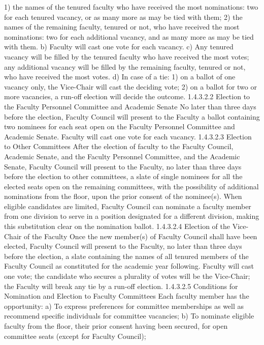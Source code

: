 \documentclass[letterpaper, 11pt]{article}
\begin{document}
1) the names of the tenured faculty who have received the most nominations:  two for each tenured vacancy, or as many more as may be tied with them;
2) the names of the remaining faculty, tenured or not, who have received the most nominations:  two for each additional vacancy, and as many more as may be tied with them.
b) Faculty will cast one vote for each vacancy.
c) Any tenured vacancy will be filled by the tenured faculty who have received the most votes; any additional vacancy will be filled by the remaining faculty, tenured or not, who have received the most votes.
d) In case of a tie:
1) on a ballot of one vacancy only, the Vice-Chair will cast the deciding vote;
2) on a ballot for two or more vacancies, a run-off election will decide the outcome.
1.4.3.2.2 Election to the Faculty Personnel Committee and Academic Senate
   No later than three days before the election, Faculty Council will present to the Faculty a ballot containing two nominees for each seat open on the Faculty Personnel Committee and Academic Senate.  Faculty will cast one vote for each vacancy.
1.4.3.2.3 Election to Other Committees
   After the election of faculty to the Faculty Council, Academic Senate, and the Faculty Personnel Committee, and the Academic Senate, Faculty Council will present to the Faculty, no later than three days before the election to other committees, a slate of single nominees for all the elected seats open on the remaining committees, with the possibility of additional nominations from the floor, upon the prior consent of the nominee(s).  When eligible candidates are limited, Faculty Council can nominate a faculty member from one division to serve in a position designated for a different division, making this substitution clear on the nomination ballot.
1.4.3.2.4 Election of the Vice-Chair of the Faculty
   Once the new member(s) of Faculty Council shall have been elected, Faculty Council will present to the Faculty, no later than three days before the election, a slate containing the names of all tenured members of the Faculty Council as constituted for the academic year following.  Faculty will cast one vote; the candidate who secures a plurality of votes will be the Vice-Chair; the Faculty will break any tie by a run-off election.
1.4.3.2.5 Conditions for Nomination and Election to Faculty Committees
   Each faculty member has the opportunity:
a) To express preferences for committee memberships as well as recommend specific individuals for committee vacancies;
b) To nominate eligible faculty from the floor, their prior consent having been secured, for open committee seats (except for Faculty Council);
\end{document}
